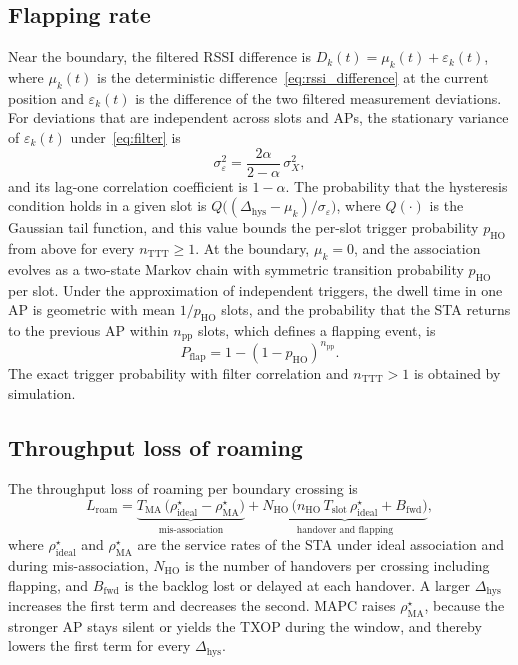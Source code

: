 \documentclass{ieeeaccess}
\begin{document}
\subsection{Flapping rate}
Near the boundary, the filtered RSSI difference is $D_k(t) = \mu_k(t) + \varepsilon_k(t)$, where $\mu_k(t)$ is the deterministic difference~\eqref{eq:rssi_difference} at the current position and $\varepsilon_k(t)$ is the difference of the two filtered measurement deviations. For deviations that are independent across slots and APs, the stationary variance of $\varepsilon_k(t)$ under~\eqref{eq:filter} is
\begin{equation}
\sigma_{\varepsilon}^2 = \frac{2\alpha}{2-\alpha}\,\sigma_X^2,
\label{eq:filtered_variance}
\end{equation}
and its lag-one correlation coefficient is $1 - \alpha$. The probability that the hysteresis condition holds in a given slot is $Q\bigl((\Delta_{\text{hys}} - \mu_k)/\sigma_{\varepsilon}\bigr)$, where $Q(\cdot)$ is the Gaussian tail function, and this value bounds the per-slot trigger probability $p_{\text{HO}}$ from above for every $n_{\text{TTT}} \ge 1$. At the boundary, $\mu_k = 0$, and the association evolves as a two-state Markov chain with symmetric transition probability $p_{\text{HO}}$ per slot. Under the approximation of independent triggers, the dwell time in one AP is geometric with mean $1/p_{\text{HO}}$ slots, and the probability that the STA returns to the previous AP within $n_{\text{pp}}$ slots, which defines a flapping event, is
\begin{equation}
P_{\text{flap}} = 1 - (1 - p_{\text{HO}})^{n_{\text{pp}}}.
\label{eq:flap}
\end{equation}
The exact trigger probability with filter correlation and $n_{\text{TTT}} > 1$ is obtained by simulation.

\subsection{Throughput loss of roaming}
The throughput loss of roaming per boundary crossing is
\begin{equation}
L_{\text{roam}} = \underbrace{T_{\text{MA}}\,\bigl(\rho^{\star}_{\text{ideal}} - \rho^{\star}_{\text{MA}}\bigr)}_{\text{mis-association}} + \underbrace{N_{\text{HO}}\,\bigl(n_{\text{HO}}\,T_{\text{slot}}\,\rho^{\star}_{\text{ideal}} + B_{\text{fwd}}\bigr)}_{\text{handover and flapping}},
\label{eq:roam_loss}
\end{equation}
where $\rho^{\star}_{\text{ideal}}$ and $\rho^{\star}_{\text{MA}}$ are the service rates of the STA under ideal association and during mis-association, $N_{\text{HO}}$ is the number of handovers per crossing including flapping, and $B_{\text{fwd}}$ is the backlog lost or delayed at each handover. A larger $\Delta_{\text{hys}}$ increases the first term and decreases the second. MAPC raises $\rho^{\star}_{\text{MA}}$, because the stronger AP stays silent or yields the TXOP during the window, and thereby lowers the first term for every $\Delta_{\text{hys}}$.
\end{document}
